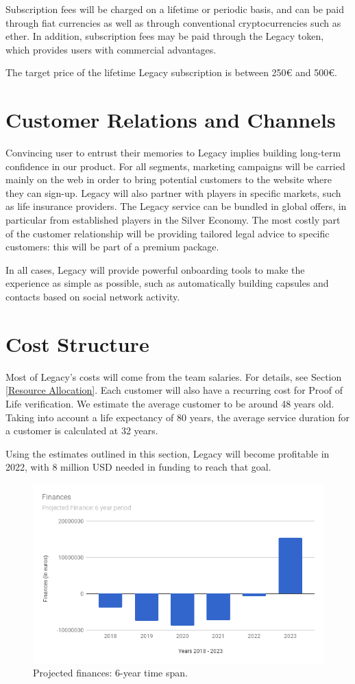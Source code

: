 Subscription fees will be charged on a lifetime or periodic basis, and can be paid through fiat currencies as well as through conventional cryptocurrencies such as ether. In addition, subscription fees may be paid through the Legacy token, which provides users with commercial advantages.

The target price of the lifetime Legacy subscription is between 250€ and 500€.

\section{Customer Relations and Channels} %
\label{sec:customer_relations_and_channels}
Convincing user to entrust their memories to Legacy implies building long-term confidence in our product.
For all segments, marketing campaigns will be carried mainly on the web in order to bring potential customers to the website where they can sign-up.
Legacy will also partner with players in specific markets, such as life insurance providers. The Legacy service can be bundled in global offers, in particular from established players in the Silver Economy.
The most costly part of the customer relationship will be providing tailored legal advice to specific customers: this will be part of a premium package.

In all cases, Legacy will provide powerful onboarding tools to make the experience as simple as possible, such as automatically building capsules and contacts based on social network activity.

\section{Cost Structure} %
\label{sec:cost_structure}
Most of Legacy’s costs will come from the team salaries. For details, see Section \ref{Resource Allocation}.
Each customer will also have a recurring cost for Proof of Life verification. We estimate the average customer to be around 48 years old. Taking into account a life expectancy of 80 years, the average service duration for a customer is calculated at 32 years.

Using the estimates outlined in this section, Legacy will become profitable in 2022, with 8 million USD needed in funding to reach that goal.

\begin{figure}[h]
  \centering
  \includegraphics[scale=0.5]{fig/finances_chart}
  \caption{Projected finances: 6-year time span.}
  \label{fig:}
\end{figure} 


